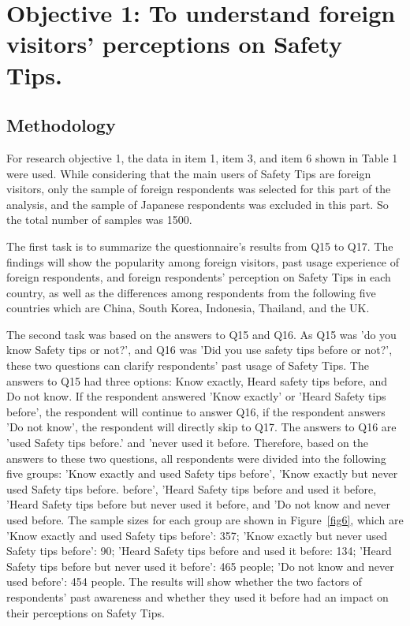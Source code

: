 \chapter{Objective 1: To understand foreign visitors' perceptions on Safety Tips.}
\label{c4}

\section{Methodology}
For research objective 1, the data in item 1, item 3, and item 6 shown in Table 1 were used. While considering that the main users of Safety Tips are foreign visitors, only the sample of foreign respondents was selected for this part of the analysis, and the sample of Japanese respondents was excluded in this part. So the total number of samples was 1500.

The first task is to summarize the questionnaire's results from Q15 to Q17. The findings will show the popularity among foreign visitors, past usage experience of foreign respondents, and foreign respondents' perception on Safety Tips in each country, as well as the differences among respondents from the following five countries which are China, South Korea, Indonesia, Thailand, and the UK.

The second task was based on the answers to Q15 and Q16. As Q15 was 'do you know Safety tips or not?', and Q16 was 'Did you use safety tips before or not?', these two questions can clarify respondents' past usage of Safety Tips. The answers to Q15 had three options: Know exactly, Heard safety tips before, and Do not know. If the respondent answered 'Know exactly' or 'Heard Safety tips before', the respondent will continue to answer Q16, if the respondent answers 'Do not know', the respondent will directly skip to Q17. The answers to Q16 are 'used Safety tips before.' and 'never used it before. Therefore, based on the answers to these two questions, all respondents were divided into the following five groups: 'Know exactly and used Safety tips before', 'Know exactly but never used Safety tips before. before', 'Heard Safety tips before and used it before, 'Heard Safety tips before but never used it before, and 'Do not know and never used before. The sample sizes for each group are shown in Figure~\ref{fig6}, which are 'Know exactly and used Safety tips before': 357; 'Know exactly but never used Safety tips before': 90; 'Heard Safety tips before and used it before: 134; 'Heard Safety tips before but never used it before': 465 people; 'Do not know and never used before': 454 people. The results will show whether the two factors of respondents' past awareness and whether they used it before had an impact on their perceptions on Safety Tips.

